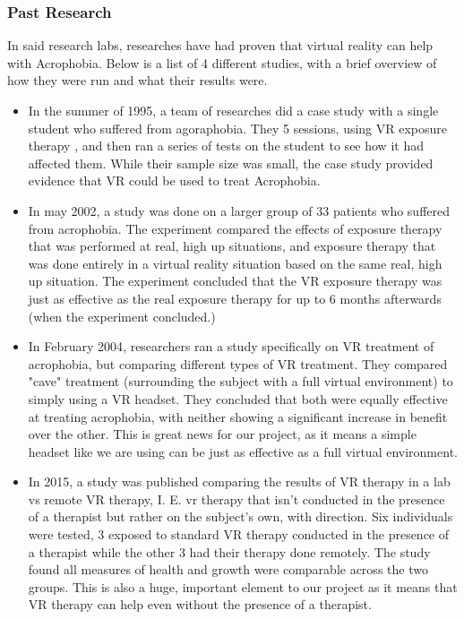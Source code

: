 \documentclass[a4paper,10pt]{article}
\begin{document}
\subsubsection{Past Research}
In said research labs, researches have had proven that virtual reality can help with Acrophobia.  Below is a list of 4 different studies, with a brief overview of how they were run and what their results were.
\begin{itemize}
	\item In the summer of 1995, a team of researches did a case study with a single student who suffered from agoraphobia.  They 5 sessions, using VR exposure therapy , and then ran a series of tests on the student to see how it had affected them.  While their sample size was small, the case study provided evidence that VR could be used to treat Acrophobia.\cite{phobiaOne}
	\item In may 2002, a study was done on a larger group of 33 patients who suffered from acrophobia.  The experiment compared the effects of exposure therapy that was performed at real, high up situations, and exposure therapy that was done entirely in a virtual reality situation based on the same real, high up situation.  The experiment concluded that the VR exposure therapy was just as effective as the real exposure therapy for up to 6 months afterwards (when the experiment concluded.)\cite{phobiaTwo}
	\item In February 2004, researchers ran a study specifically on VR treatment of acrophobia, but comparing different types of VR treatment. They compared "cave" treatment (surrounding the subject with a full virtual environment) to simply using a VR headset.   They concluded that both were equally effective at treating acrophobia, with neither showing a significant increase in benefit over the other.  This is great news for our project, as it means a simple headset like we are using can be just as effective as a full virtual environment.\cite{phobiaThree}
	\item In 2015, a study was published comparing the results of VR therapy in a lab vs remote VR therapy, I. E. vr therapy that isn't conducted in the presence of a therapist but rather on the subject's own, with direction.  Six individuals were tested, 3 exposed to standard VR therapy conducted in the presence of a therapist while the other 3 had their therapy done remotely.  The study found all measures of health and growth were comparable across the two groups. This is also a huge, important element to our project as it means that VR therapy can help even without the presence of a therapist.\cite{phobiaFour}
\end{itemize}
\end{document}
